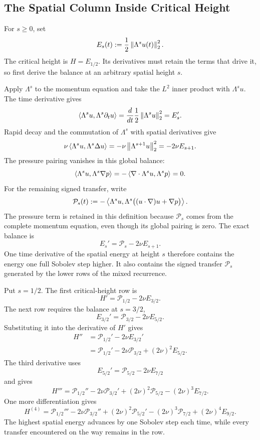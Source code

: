 
\subsection{The Spatial Column Inside Critical Height}\label{sub:TheSpatialColumnInsideCriticalHeight}

For \(s\geq0\), set
\[
  E_s(t)
  :=
  \frac12\left\lVert \Lambda^su(t)\right\rVert_2^2.
\]
The critical height is \(H=E_{1/2}\).
Its derivatives must retain the terms that drive it, so first derive the balance at an arbitrary spatial height \(s\).

Apply \(\Lambda^s\) to the momentum equation and take the \(L^2\) inner product with \(\Lambda^su\).
The time derivative gives
\[
  \left\langle \Lambda^su,\Lambda^s\partial_tu\right\rangle
  =
  \frac{d}{dt}
  \frac12\left\lVert \Lambda^su\right\rVert_2^2
  =
  E_s'.
\]
Rapid decay and the commutation of \(\Lambda^s\) with spatial derivatives give
\[
  \nu\left\langle \Lambda^su,\Lambda^s\Delta u\right\rangle
  =
  -\nu\left\lVert \Lambda^{s+1}u\right\rVert_2^2
  =
  -2\nu E_{s+1}.
\]
The pressure pairing vanishes in this global balance:
\[
  \left\langle \Lambda^su,\Lambda^s\nabla p\right\rangle
  =
  -\left\langle \nabla\cdot\Lambda^su,\Lambda^sp\right\rangle
  =
  0.
\]
For the remaining signed transfer, write
\[
  \mathcal P_s(t)
  :=
  -\left\langle \Lambda^su,\Lambda^s\bigl((u\cdot\nabla)u+\nabla p\bigr)\right\rangle.
\]
The pressure term is retained in this definition because \(\mathcal P_s\) comes from the complete momentum equation, even though its global pairing is zero.
The exact balance is
\[
  E_s'
  =
  \mathcal P_s-2\nu E_{s+1}.
\]
One time derivative of the spatial energy at height \(s\) therefore contains the energy one full Sobolev step higher.
It also contains the signed transfer \(\mathcal P_s\) generated by the lower rows of the mixed recurrence.

Put \(s=1/2\).
The first critical-height row is
\[
  H'
  =
  \mathcal P_{1/2}
  -2\nu E_{3/2}.
\]
The next row requires the balance at \(s=3/2\),
\[
  E_{3/2}'
  =
  \mathcal P_{3/2}
  -2\nu E_{5/2}.
\]
Substituting it into the derivative of \(H'\) gives
\begin{align*}
  H''
  &=
  \mathcal P_{1/2}'
  -2\nu E_{3/2}'
  \\
  &=
  \mathcal P_{1/2}'
  -2\nu\mathcal P_{3/2}
  +(2\nu)^2E_{5/2}.
\end{align*}
The third derivative uses
\[
  E_{5/2}'
  =
  \mathcal P_{5/2}
  -2\nu E_{7/2}
\]
and gives
\[
  H'''
  =
  \mathcal P_{1/2}''
  -2\nu\mathcal P_{3/2}'
  +(2\nu)^2\mathcal P_{5/2}
  -(2\nu)^3E_{7/2}.
\]
One more differentiation gives
\[
  H^{(4)}
  =
  \mathcal P_{1/2}'''
  -2\nu\mathcal P_{3/2}''
  +(2\nu)^2\mathcal P_{5/2}'
  -(2\nu)^3\mathcal P_{7/2}
  +(2\nu)^4E_{9/2}.
\]
The highest spatial energy advances by one Sobolev step each time, while every transfer encountered on the way remains in the row.


